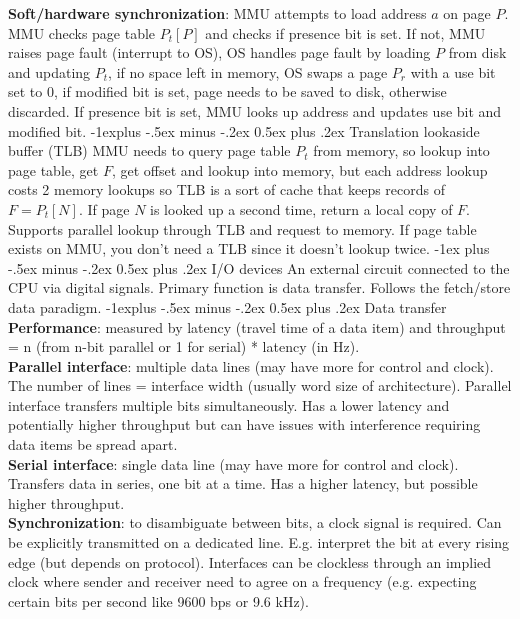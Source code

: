 \documentclass[10pt,landscape]{article}
\makeatletter
\renewcommand{\section}{\@startsection{section}{1}{0mm}%
                                {-1ex plus -.5ex minus -.2ex}%
                                {0.5ex plus .2ex}%
                                {\normalfont\small\bfseries}}
\renewcommand{\subsection}{\@startsection{subsection}{2}{0mm}%
                                {-1explus -.5ex minus -.2ex}%
                                {0.5ex plus .2ex}%
                                {\normalfont\scriptsize\bfseries}}
\makeatother
\begin{document}
\begin{multicols}{3}
\textbf{Soft/hardware synchronization}: MMU attempts to load address $a$ on page $P$. MMU checks page table $P_t[P]$ and checks if presence bit is set. If not, MMU raises page fault (interrupt to OS), OS handles page fault by loading $P$ from disk and updating $P_t$, if no space left in memory, OS swaps a page $P_r$ with a use bit set to 0, if modified bit is set, page needs to be saved to disk, otherwise discarded. If presence bit is set, MMU looks up address and updates use bit and modified bit.
\subsection{Translation lookaside buffer (TLB)}
MMU needs to query page table $P_t$ from memory, so lookup into page table, get $F$, get offset and lookup into memory, but each address lookup costs 2 memory lookups so TLB is a sort of cache that keeps records of $F=P_t[N]$. If page $N$ is looked up a second time, return a local copy of $F$. Supports parallel lookup through TLB and request to memory. If page table exists on MMU, you don't need a TLB since it doesn't lookup twice. 
\section{I/O devices}
An external circuit connected to the CPU via digital signals. Primary function is data transfer. Follows the fetch/store data paradigm.
\subsection{Data transfer}
\textbf{Performance}: measured by latency (travel time of a data item) and throughput = n (from n-bit parallel or 1 for serial) * latency (in Hz).\\
\textbf{Parallel interface}: multiple data lines (may have more for control and clock). The number of lines = interface width (usually word size of architecture). Parallel interface transfers multiple bits simultaneously. Has a lower latency and potentially higher throughput but can have issues with interference requiring data items be spread apart.\\
\textbf{Serial interface}: single data line (may have more for control and clock). Transfers data in series, one bit at a time. Has a higher latency, but possible higher throughput.\\
\textbf{Synchronization}: to disambiguate between bits, a clock signal is required. Can be explicitly transmitted on a dedicated line. E.g. interpret the bit at every rising edge (but depends on protocol). Interfaces can be clockless through an implied clock where sender and receiver need to agree on a frequency (e.g. expecting certain bits per second like 9600 bps or 9.6 kHz). 

\end{multicols}
\end{document}
